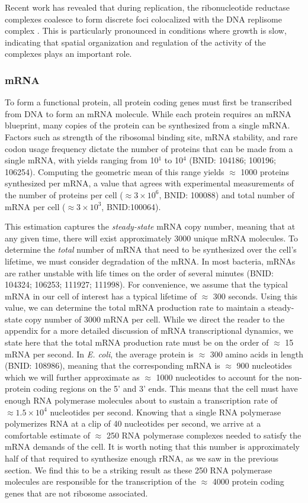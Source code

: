 Recent work has revealed that during replication, the ribonucleotide reductase
complexes coalesce to form discrete foci colocalized with the DNA replisome
complex \citep{sanchez-romero2011}. This is particularly pronounced in
conditions where growth is slow, indicating that spatial organization and
regulation of the activity of the complexes plays an important role.


\subsubsection{mRNA}
To form a functional protein, all protein coding genes must first be
transcribed from DNA to form an mRNA molecule. While each protein requires an
mRNA blueprint, many copies of the protein can be synthesized from a single
mRNA. Factors such as strength of the ribosomal binding site, mRNA stability,
and rare codon usage frequency dictate the number of proteins that can be
made from a single mRNA, with yields ranging from 10$^1$ to 10$^4$ (BNID: 104186; 100196;
106254). Computing the geometric mean of this range yields
$\approx$ 1000 proteins synthesized per mRNA, a value that agrees with
experimental measurements of the number of proteins per cell ($\approx 3
\times 10^6$, BNID: 100088) and total number of mRNA per
cell ($\approx 3 \times 10^3$, BNID:100064).

This estimation captures the \textit{steady-state} mRNA copy number, meaning
that at any given time, there will exist approximately 3000 unique mRNA
molecules. To determine the \textit{total} number of mRNA that need to be
synthesized over the cell's lifetime, we must consider degradation of the mRNA.
In most bacteria, mRNAs are rather unstable with life times on the order of
several minutes (BNID: 104324; 106253; 111927; 111998). For
convenience, we assume that the typical mRNA in our cell of interest has a
typical lifetime of $\approx$ 300 seconds. Using this value, we can determine
the total mRNA production rate to maintain a steady-state copy number of 3000
mRNA per cell. While we direct the reader to the appendix for a more detailed
discussion of mRNA transcriptional dynamics, we state here that the total mRNA
production rate must be on the order of $\approx$ 15 mRNA per second. In
\textit{E. coli}, the average protein is $\approx$ 300 amino acids in length
(BNID: 108986), meaning that the corresponding mRNA is
$\approx$ 900 nucleotides which we will further approximate as $\approx$ 1000
nucleotides to account for the non-protein coding regions on the 5' and
3' ends. This means that the cell must have enough RNA polymerase molecules
about to sustain a transcription rate of $\approx 1.5 \times 10^4$ nucleotides
per second. Knowing that a single RNA polymerase polymerizes RNA at a clip of 40
nucleotides per second, we arrive at a comfortable estimate of $\approx$ 250 RNA
polymerase complexes needed to satisfy the mRNA demands of the cell. It is worth
noting that this number is approximately half of that required to synthesize
enough rRNA, as we saw in the previous section. We find this to be a striking
result as these 250 RNA polymerase molecules are responsible for the
transcription of the $\approx$ 4000 protein coding genes that are not ribosome
associated.

